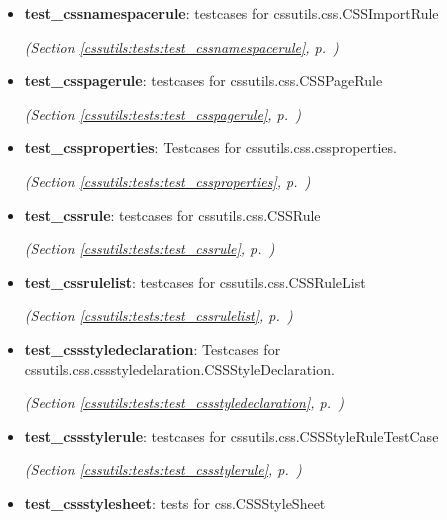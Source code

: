 \begin{itemize}
\item \textbf{test\_cssnamespacerule}: testcases for cssutils.css.CSSImportRule



  \textit{(Section \ref{cssutils:tests:test_cssnamespacerule}, p.~\pageref{cssutils:tests:test_cssnamespacerule})}

\item \textbf{test\_csspagerule}: testcases for cssutils.css.CSSPageRule



  \textit{(Section \ref{cssutils:tests:test_csspagerule}, p.~\pageref{cssutils:tests:test_csspagerule})}

\item \textbf{test\_cssproperties}: Testcases for cssutils.css.cssproperties.



  \textit{(Section \ref{cssutils:tests:test_cssproperties}, p.~\pageref{cssutils:tests:test_cssproperties})}

\item \textbf{test\_cssrule}: testcases for cssutils.css.CSSRule



  \textit{(Section \ref{cssutils:tests:test_cssrule}, p.~\pageref{cssutils:tests:test_cssrule})}

\item \textbf{test\_cssrulelist}: testcases for cssutils.css.CSSRuleList



  \textit{(Section \ref{cssutils:tests:test_cssrulelist}, p.~\pageref{cssutils:tests:test_cssrulelist})}

\item \textbf{test\_cssstyledeclaration}: Testcases for cssutils.css.cssstyledelaration.CSSStyleDeclaration.



  \textit{(Section \ref{cssutils:tests:test_cssstyledeclaration}, p.~\pageref{cssutils:tests:test_cssstyledeclaration})}

\item \textbf{test\_cssstylerule}: testcases for cssutils.css.CSSStyleRuleTestCase



  \textit{(Section \ref{cssutils:tests:test_cssstylerule}, p.~\pageref{cssutils:tests:test_cssstylerule})}

\item \textbf{test\_cssstylesheet}: tests for css.CSSStyleSheet




\end{itemize}
